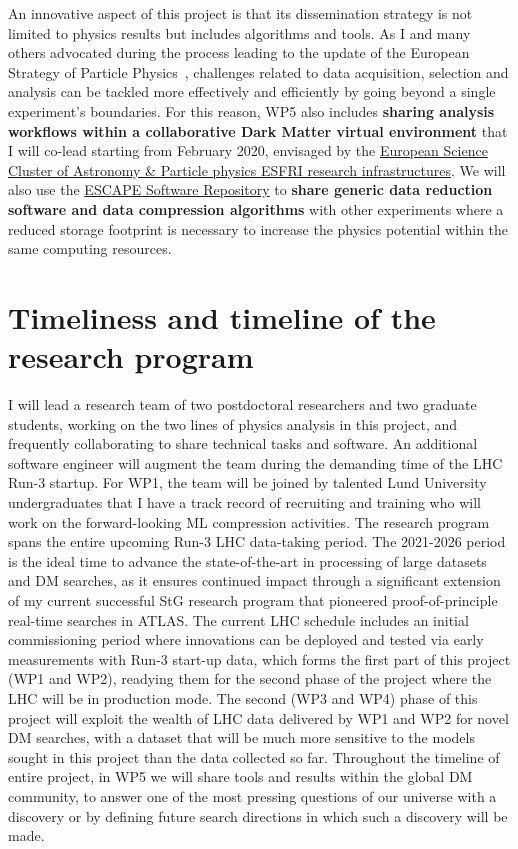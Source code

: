 \documentclass[11pt,a4paper]{article}
\begin{document}
An innovative aspect of this project is that its dissemination strategy is not limited to physics results but includes algorithms and tools. 
As I and many others advocated during the process leading to the update of the European Strategy of Particle Physics~\cite{Doglioni:2019fza}, challenges related to data acquisition, selection and analysis can be tackled more effectively and efficiently by going beyond a single experiment's boundaries. 
For this reason, WP5 also includes \textbf{sharing analysis workflows within a collaborative Dark Matter virtual environment} that I will co-lead starting from February 2020, envisaged by the \href{https://projectescape.eu}{European Science Cluster of Astronomy \& Particle physics ESFRI research infrastructures}. We will also use the \href{https://projectescape.eu/services/open-source-scientific-software-and-service-repository}{ESCAPE Software Repository} to \textbf{share generic data reduction software and data compression algorithms} with other experiments where a reduced storage footprint is necessary to increase the physics potential within the same computing resources. %

\section{Timeliness and timeline of the research program} 
\smallskip

I will lead a research team of two postdoctoral researchers and two graduate students, working on the two lines of physics analysis in this project, and frequently collaborating to share technical tasks and software. An additional software engineer will augment the team during the demanding time of the LHC Run-3 startup. 
For WP1, the team will be joined by talented Lund University undergraduates that I have a track record of recruiting and training who will work on the forward-looking ML compression activities.
The research program spans the entire upcoming Run-3 LHC data-taking period.
The 2021-2026 period is the ideal time to advance the state-of-the-art in processing of large datasets and DM searches, as it ensures continued impact through a significant extension of my current successful StG research program that pioneered proof-of-principle real-time searches in ATLAS. 
The current LHC schedule includes an initial commissioning period where innovations can be deployed and tested via early measurements with Run-3 start-up data, which forms the first part of this project (WP1 and WP2), readying them for the second phase of the project where the LHC will be in production mode.   
The second (WP3 and WP4) phase of this project will exploit the wealth of LHC data delivered by WP1 and WP2 for novel DM searches, with a dataset that will be much more sensitive to the models sought in this project than the data collected so far. 
Throughout the timeline of entire project, in WP5 we will share tools and results within the global DM community, to answer one of the most pressing questions of our universe with a discovery or by defining future search directions in which such a discovery will be made. 
\end{document}
